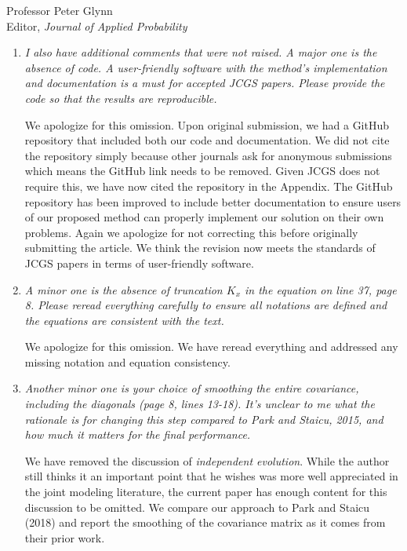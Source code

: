 \documentclass[11pt]{letter} %
\begin{document}
\begin{letter}{Professor
	Peter Glynn\\
	Editor, {\em Journal of Applied Probability}}
\begin{enumerate}
\item {\it I also have additional comments that were not raised. A major one is the absence of code. A user-friendly software with the method’s implementation and documentation is a must for accepted JCGS papers. Please provide the code so that the results are reproducible.}

\vspace{5mm}
We apologize for this omission.  Upon original submission, we had a GitHub repository that included both our code and documentation.  We did not cite the repository simply because other journals ask for anonymous submissions which means the GitHub link needs to be removed.  Given JCGS does not require this, we have now cited the repository in the Appendix.  The GitHub repository has been improved to include better documentation to ensure users of our proposed method can properly implement our solution on their own problems. Again we apologize for not correcting this before originally submitting the article. We think the revision now meets the standards of JCGS papers in terms of user-friendly software.
\vspace{5mm}

\item {\it
A minor one is the absence of truncation $K_x$ in the equation on line 37, page 8. Please reread everything carefully to ensure all notations are defined and the equations are consistent with the text.}

\vspace{5mm}
We apologize for this omission. We have reread everything and addressed any missing notation and equation consistency.
\vspace{5mm}

\item {\it Another minor one is your choice of smoothing the entire covariance, including the diagonals (page 8, lines 13-18). It’s unclear to me what the rationale is for changing this step compared to Park and Staicu, 2015, and how much it matters for the final performance.}

\vspace{5mm}
We have removed the discussion of \emph{independent evolution}.  While the author still thinks it an important point that he wishes was more well appreciated in the joint modeling literature, the current paper has enough content for this discussion to be omitted.  We compare our approach to Park and Staicu (2018) and report the smoothing of the covariance matrix as it comes from their prior work.
\vspace{5mm}


\end{enumerate}
\end{letter}
\end{document}
